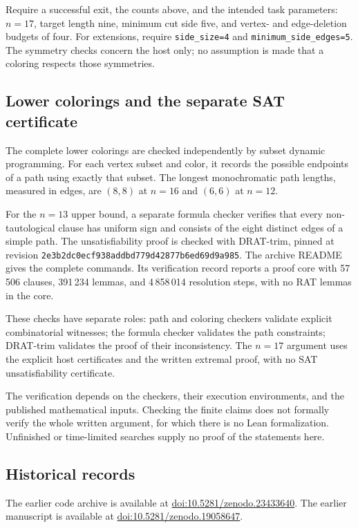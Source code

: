 \documentclass[12pt]{article}
\begin{document}
Require a successful exit, the counts above, and the intended
task parameters: $n=17$, target length nine, minimum cut
side five, and vertex- and edge-deletion budgets of four.
For extensions, require \texttt{side\_size=4} and
\texttt{minimum\_side\_edges=5}. The symmetry checks concern
the host only; no assumption is made that a coloring
respects those symmetries.

\subsection{Lower colorings and the separate SAT certificate}

The complete lower colorings are checked independently by
subset dynamic programming. For each vertex subset and
color, it records the possible endpoints of a path using
exactly that subset. The longest monochromatic path lengths,
measured in edges, are $(8,8)$ at $n=16$ and $(6,6)$ at
$n=12$.

For the $n=13$ upper bound, a separate formula checker verifies
that every non-tautological clause has uniform sign and
consists of the eight distinct edges of a simple path.
The unsatisfiability proof is checked with DRAT-trim, pinned
at revision
{\small\texttt{2e3b2dc0ecf938addbd779d42877b6ed69d9a985}}.
The archive README gives the complete commands.
Its verification record reports a proof core with
57\,506 clauses, 391\,234 lemmas, and 4\,858\,014 resolution
steps, with no RAT lemmas in the core.

These checks have separate roles: path and coloring checkers
validate explicit combinatorial witnesses; the formula
checker validates the path constraints; DRAT-trim validates
the proof of their inconsistency. The $n=17$ argument uses
the explicit host certificates and the written extremal
proof, with no SAT unsatisfiability certificate.

The verification depends on the checkers, their execution
environments, and the published mathematical inputs.
Checking the finite claims does not formally verify the
whole written argument, for which there is no Lean
formalization. Unfinished or time-limited searches supply
no proof of the statements here.

\subsection{Historical records}

The earlier code archive is available at
\href{https://doi.org/10.5281/zenodo.23433640}
{doi:10.5281/zenodo.23433640}.
The earlier manuscript is available at
\href{https://doi.org/10.5281/zenodo.19058647}
{doi:10.5281/zenodo.19058647}.
\end{document}
